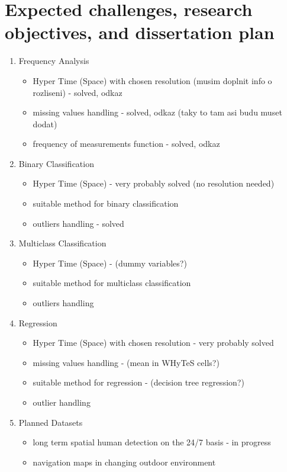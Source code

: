 \section{Expected challenges, research objectives, and dissertation plan}

\begin{enumerate}
    \item Frequency Analysis
    \begin{itemize}
        \item Hyper Time (Space) with chosen resolution (musim doplnit info o rozliseni) - solved, odkaz
        \item missing values handling - solved, odkaz (taky to tam asi budu muset dodat)
        \item frequency of measurements function - solved, odkaz
    \end{itemize}
    \item Binary Classification
    \begin{itemize}
        \item Hyper Time (Space) - very probably solved (no resolution needed)
        \item suitable method for binary classification
        \item outliers handling - solved
    \end{itemize}
    \item Multiclass Classification
    \begin{itemize}
        \item Hyper Time (Space) - (dummy variables?)
        \item suitable method for multiclass classification
        \item outliers handling
    \end{itemize}
    \item Regression
    \begin{itemize}
        \item Hyper Time (Space) with chosen resolution - very probably solved
        \item missing values handling - (mean in WHyTeS cells?)
        \item suitable method for regression - (decision tree regression?)
        \item outlier handling
    \end{itemize}
    \item Planned Datasets
    \begin{itemize}
        \item long term spatial human detection on the 24/7 basis - in progress
        \item navigation maps in changing outdoor environment
    \end{itemize} 
\end{enumerate}
    
        
